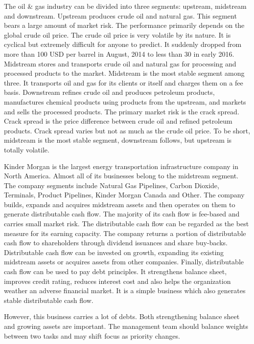 \documentclass[11pt]{article}
\begin{document}
The oil \& gas industry can be divided into three segments: upstream, midstream and downstream. Upstream produces crude oil and natural gas. This segment bears a large amount of market risk. The performance primarily depends on the global crude oil price. The crude oil price is very volatile by its nature. It is cyclical but extremely difficult for anyone to predict. It suddenly dropped from more than 100 USD per barrel in August, 2014 to less than 30 in early 2016. Midstream stores and transports crude oil and natural gas for processing and processed products to the market. Midstream is the most stable segment among three. It transports oil and gas for its clients or itself and charges them on a fee basis. Downstream refines crude oil and produces petroleum products, manufactures chemical products using products from the upstream, and markets and sells the processed products. The primary market risk is the crack spread. Crack spread is the price difference between crude oil and refined petroleum products. Crack spread varies but not as much as the crude oil price. To be short, midstream is the most stable segment, downstream follows, but upstream is totally volatile.

Kinder Morgan is the largest energy transportation infrastructure company in North America. Almost all of its businesses belong to the midstream segment. The company segments include Natural Gas Pipelines, Carbon Dioxide, Terminals, Product Pipelines, Kinder Morgan Canada and Other. The company builds, expands and acquires midstream assets and then operates on them to generate distributable cash flow. The majority of its cash flow is fee-based and carries small market risk. The distributable cash flow can be regarded as the best measure for its earning capacity. The company returns a portion of distributable cash flow to shareholders through dividend issuances and share buy-backs. Distributable cash flow can be invested on growth, expanding its existing midstream assets or acquires assets from other companies. Finally, distributable cash flow can be used to pay debt principles. It strengthens balance sheet, improves credit rating, reduces interest cost and also helps the organization weather an adverse financial market. It is a simple business which also generates stable distributable cash flow.   

However, this business carries a lot of debts. Both strengthening balance sheet and growing assets are important. The management team should balance weights between two tasks and may shift focus as priority changes. 
\end{document}

